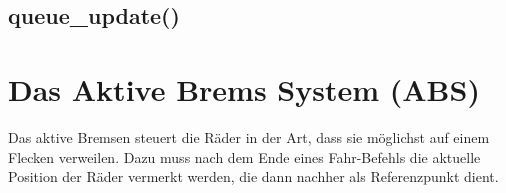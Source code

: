\subsection{queue\_update()}
\section{Das Aktive Brems System (ABS)}
Das aktive Bremsen steuert die Räder in der Art, dass sie möglichst
auf einem Flecken verweilen. Dazu muss nach dem Ende eines Fahr-Befehls die aktuelle Position der Räder
vermerkt werden, die dann nachher als Referenzpunkt dient.
